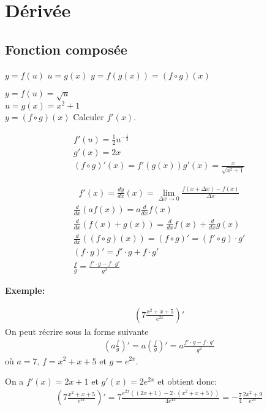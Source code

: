 \chapter{Dérivée}
\section{Fonction composée}
\begin{myDefinition}
	$y=f(u)$ $u=g(x)$ $y=f(g(x))=(f\circ g)(x)$
\end{myDefinition}
\begin{myExample}
	
	
	$y=f(u)=\sqrt{u}$ 
	\\
	$u=g(x)=x^2+1$
	\\
	$y=(f\circ g)(x)$
	Calculer $f'(x)$.
	
	\begin{eqnarray*}
		f'(u)=\frac{1}{2}u^{-\frac{1}{2}}
		\\
		g'(x)=2x
		\\
		(f\circ g)'(x)=f'(g(x))g'(x)=\frac{x}{\sqrt{x^2+1}}
	\end{eqnarray*}
\end{myExample}
\begin{eqnarray}
	f'(x)=\frac{dy}{dx}(x)=\lim_{\Delta x\rightarrow 0}\frac{f(x+\Delta x)-f(x)}{\Delta x}
\end{eqnarray}
\begin{eqnarray}
	\frac{d}{dx}(af(x))=a\frac{d}{dx}f(x)
	\\
	\frac{d}{dx}\left(f(x)+g(x)\right)=	\frac{d}{dx}f(x)+\frac{d}{dx}g(x)
	\\
	\frac{d}{dx}\left((f\circ g)(x)\right)=(f \circ g)' = (f'\circ g) \cdot g'
	\\
	(f\cdot g)'=f'\cdot g+f\cdot g'
	\\
	\frac{f}{g}=\frac{f'\cdot g-f\cdot g'}{g^2}
\end{eqnarray}

\textbf{Exemple:}

\begin{eqnarray*}
	\left(7\frac{x^2+x+5}{e^{2x}}\right)'
\end{eqnarray*}
On peut récrire sous la forme suivante
\begin{eqnarray}
	\left(a\frac{f}{g}\right)'=a\left(\frac{f}{g}\right)'=a\frac{f'\cdot g-f\cdot g'}{g^2}
\end{eqnarray}
où $a=7$, $f=x^2+x+5$ et $g=e^{2x}$. 

On a $f'(x)=2x+1$ et $g'(x)=2e^{2x}$ et obtient donc:
\begin{eqnarray*}
	\left(7\frac{x^2+x+5}{e^{2x}}\right)'=7\frac{e^{2x}((2x+1)-2\cdot(x^2+x+5))}{4e^{4x}}
	=-\frac{7}{4}\frac{2x^2+9}{e^{2x}}
\end{eqnarray*}

